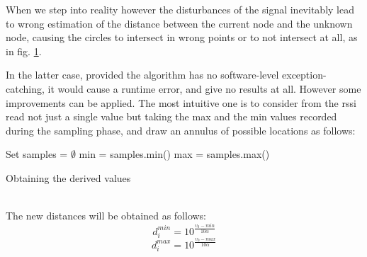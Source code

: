 \documentclass[12pt,twoside]{report}
\begin{document}
When we step into reality however the disturbances of the signal inevitably lead to wrong estimation of the distance between the current node and the unknown node, causing the circles to intersect in wrong points or to not intersect at all, as in fig. \ref{fig:trilKO}.
\begin{figure}
    \centering
    \caption{}
    \label{fig:trilKO}
\end{figure}
In the latter case, provided the algorithm has no software-level exception-catching, it would cause a runtime error, and give no results at all. However some improvements can be applied. The most intuitive one is to consider from the rssi read not just a single value but taking the max and the min values recorded during the sampling phase, and draw an annulus of possible locations as follows:
\begin{algorithm}[H]
\SetAlgoLined
{}
 Set samples = $\emptyset$\;
 min = samples.min()\;
 max = samples.max()\;
 \caption{Obtaining the derived values}
\end{algorithm}
\noindent\\The new distances will be obtained as follows:
\begin{equation}
    d_i^{min}=10^{\frac{\upsilon_0-min}{10\alpha}}    
\end{equation}
\begin{equation}
    d_i^{max}=10^{\frac{\upsilon_0-max}{10\alpha}}    
\end{equation}
\end{document}

